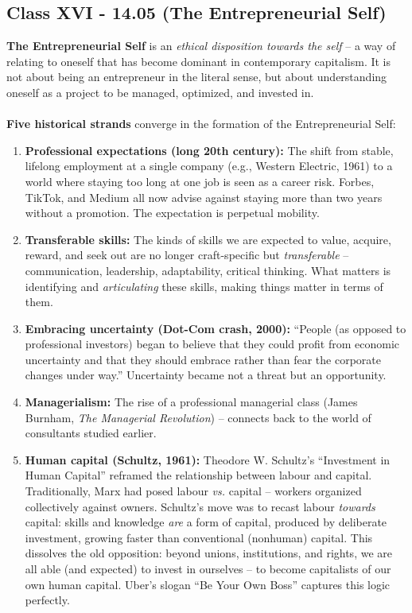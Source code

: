 \documentclass[a4paper,12pt]{article}
\begin{document}
\subsection*{Class XVI - 14.05 (The Entrepreneurial Self)}
\noindent \textbf{The Entrepreneurial Self} is an \emph{ethical disposition towards the self} -- a way of relating to oneself that has become dominant in contemporary capitalism. It is not about being an entrepreneur in the literal sense, but about understanding oneself as a project to be managed, optimized, and invested in. \\
\\
\noindent \textbf{Five historical strands} converge in the formation of the Entrepreneurial Self:
\begin{enumerate}
	\item \textbf{Professional expectations (long 20th century):} The shift from stable, lifelong employment at a single company (e.g., Western Electric, 1961) to a world where staying too long at one job is seen as a career risk. Forbes, TikTok, and Medium all now advise against staying more than two years without a promotion. The expectation is perpetual mobility.
	\item \textbf{Transferable skills:} The kinds of skills we are expected to value, acquire, reward, and seek out are no longer craft-specific but \emph{transferable} -- communication, leadership, adaptability, critical thinking. What matters is identifying and \emph{articulating} these skills, making things matter in terms of them.
	\item \textbf{Embracing uncertainty (Dot-Com crash, 2000):} ``People (as opposed to professional investors) began to believe that they could profit from economic uncertainty and that they should embrace rather than fear the corporate changes under way.'' Uncertainty became not a threat but an opportunity.
	\item \textbf{Managerialism:} The rise of a professional managerial class (James Burnham, \emph{The Managerial Revolution}) -- connects back to the world of consultants studied earlier.
	\item \textbf{Human capital (Schultz, 1961):} Theodore W. Schultz's ``Investment in Human Capital'' reframed the relationship between labour and capital. Traditionally, Marx had posed labour \emph{vs.} capital -- workers organized collectively against owners. Schultz's move was to recast labour \emph{towards} capital: skills and knowledge \emph{are} a form of capital, produced by deliberate investment, growing faster than conventional (nonhuman) capital. This dissolves the old opposition: beyond unions, institutions, and rights, we are all able (and expected) to invest in ourselves -- to become capitalists of our own human capital. Uber's slogan ``Be Your Own Boss'' captures this logic perfectly.
\end{enumerate}
\end{document}
